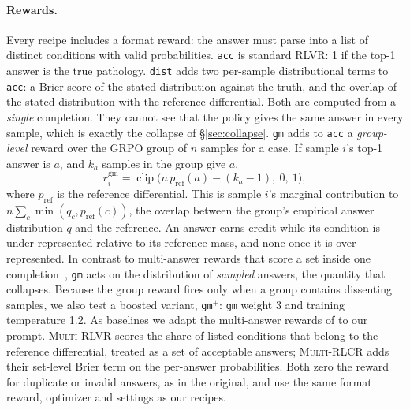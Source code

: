 \documentclass[11pt]{article}
\begin{document}
\paragraph{Rewards.}
Every recipe includes a format reward: the answer must parse into a list of distinct conditions with valid probabilities.
\texttt{acc} is standard RLVR: 1 if the top-1 answer is the true pathology.
\texttt{dist} adds two per-sample distributional terms to \texttt{acc}: a Brier score of the stated distribution against the truth, and the overlap of the stated distribution with the reference differential.
Both are computed from a \emph{single} completion. They cannot see that the policy gives the same answer in every sample, which is exactly the collapse of \S\ref{sec:collapse}.
\texttt{gm} adds to \texttt{acc} a \emph{group-level} reward over the GRPO group of $n$ samples for a case. If sample $i$'s top-1 answer is $a$, and $k_a$ samples in the group give $a$,
\begin{equation}
r_i^{\mathrm{gm}} = \operatorname{clip}\!\big(n\,p_{\mathrm{ref}}(a) - (k_a - 1),\ 0,\ 1\big),
\end{equation}
where $p_{\mathrm{ref}}$ is the reference differential. This is sample $i$'s marginal contribution to $n\sum_c \min(q_c,\allowbreak p_{\mathrm{ref}}(c))$, the overlap between the group's empirical answer distribution $q$ and the reference. An answer earns credit while its condition is under-represented relative to its reference mass, and none once it is over-represented.
In contrast to multi-answer rewards that score a set inside one completion~\citep{puri2026beyondmode}, \texttt{gm} acts on the distribution of \emph{sampled} answers, the quantity that collapses.
Because the group reward fires only when a group contains dissenting samples, we also test a boosted variant, \texttt{gm}$^{+}$: \texttt{gm} weight 3 and training temperature 1.2.
As baselines we adapt the multi-answer rewards of \citet{puri2026beyondmode} to our prompt. \textsc{Multi-RLVR} scores the share of listed conditions that belong to the reference differential, treated as a set of acceptable answers; \textsc{Multi-RLCR} adds their set-level Brier term on the per-answer probabilities. Both zero the reward for duplicate or invalid answers, as in the original, and use the same format reward, optimizer and settings as our recipes.
\end{document}
